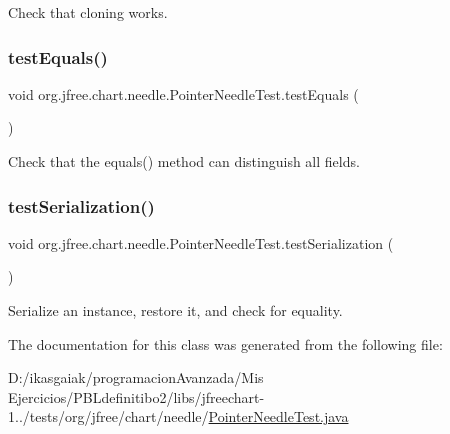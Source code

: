 Check that cloning works. \mbox{\label{classorg_1_1jfree_1_1chart_1_1needle_1_1_pointer_needle_test_a8290cdaaaadeeefa5f9089b14c2d117c}} 
\subsubsection{\texorpdfstring{test\+Equals()}{testEquals()}}
{\footnotesize\ttfamily void org.\+jfree.\+chart.\+needle.\+Pointer\+Needle\+Test.\+test\+Equals (\begin{DoxyParamCaption}{ }\end{DoxyParamCaption})}

Check that the equals() method can distinguish all fields. \mbox{\label{classorg_1_1jfree_1_1chart_1_1needle_1_1_pointer_needle_test_a7771d5cb145ff7aec113fbe96cabb08c}} 
\subsubsection{\texorpdfstring{test\+Serialization()}{testSerialization()}}
{\footnotesize\ttfamily void org.\+jfree.\+chart.\+needle.\+Pointer\+Needle\+Test.\+test\+Serialization (\begin{DoxyParamCaption}{ }\end{DoxyParamCaption})}

Serialize an instance, restore it, and check for equality. 

The documentation for this class was generated from the following file\+:\begin{DoxyCompactItemize}
\item 
D\+:/ikasgaiak/programacion\+Avanzada/\+Mis Ejercicios/\+P\+B\+Ldefinitibo2/libs/jfreechart-\/1../tests/org/jfree/chart/needle/\mbox{\hyperlink{_pointer_needle_test_8java}{Pointer\+Needle\+Test.\+java}}\end{DoxyCompactItemize}
